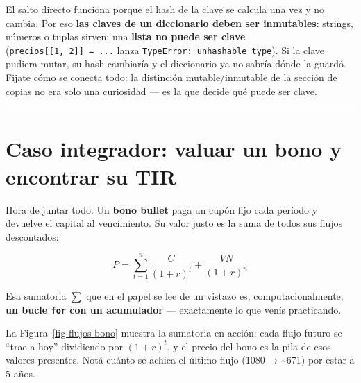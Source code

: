 \documentclass[
  spanish,
  letterpaper,
  DIV=11,
  numbers=noendperiod]{scrreprt}
\begin{document}
\begin{tcolorbox}[enhanced jigsaw, bottomrule=.15mm, colback=white, opacitybacktitle=0.6, arc=.35mm, toprule=.15mm, opacityback=0, breakable, titlerule=0mm, left=2mm, coltitle=black, colbacktitle=quarto-callout-note-color!10!white, colframe=quarto-callout-note-color-frame, leftrule=.75mm, toptitle=1mm, bottomtitle=1mm, title=\textcolor{quarto-callout-note-color}{\faInfo}\hspace{0.5em}{El precio del truco: claves inmutables}, rightrule=.15mm]

El salto directo funciona porque el hash de la clave se calcula una vez
y no cambia. Por eso \textbf{las claves de un diccionario deben ser
inmutables}: strings, números o tuplas sirven; una \textbf{lista no
puede ser clave} (\texttt{precios{[}{[}1,\ 2{]}{]}\ =\ ...} lanza
\texttt{TypeError:\ unhashable\ type}). Si la clave pudiera mutar, su
hash cambiaría y el diccionario ya no sabría dónde la guardó. Fijate
cómo se conecta todo: la distinción mutable/inmutable de la sección de
copias no era solo una curiosidad --- es la que decide qué puede ser
clave.

\end{tcolorbox}

\begin{center}\rule{0.5\linewidth}{0.5pt}\end{center}

\section{Caso integrador: valuar un bono y encontrar su
TIR}\label{caso-integrador-valuar-un-bono-y-encontrar-su-tir}

Hora de juntar todo. Un \textbf{bono bullet} paga un cupón fijo cada
período y devuelve el capital al vencimiento. Su valor justo es la suma
de todos sus flujos descontados:

\[P = \sum_{t=1}^{n} \frac{C}{(1+r)^t} + \frac{VN}{(1+r)^n}\]

Esa sumatoria \(\sum\) que en el papel se lee de un vistazo es,
computacionalmente, \textbf{un bucle \texttt{for} con un acumulador} ---
exactamente lo que venís practicando.

La Figura~\ref{fig-flujos-bono} muestra la sumatoria en acción: cada
flujo futuro se ``trae a hoy'' dividiendo por \((1+r)^t\), y el precio
del bono es la pila de esos valores presentes. Notá cuánto se achica el
último flujo (1080 → \textasciitilde671) por estar a 5 años.
\end{document}
